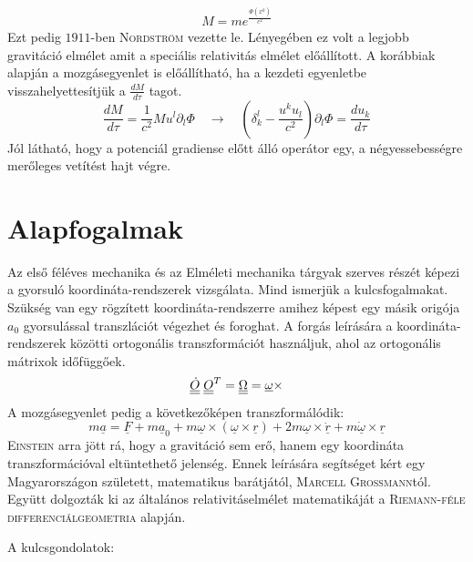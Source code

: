 \documentclass[a4paper, 12pt]{article}
\def\doubleunderline#1{\underline{\underline{#1}}}
\begin{document}
\begin{align*}
M = m e^{\frac{\Phi(x^{k})}{c^{2}}}
\end{align*}
Ezt pedig $1911$-ben \textsc{Nordström} vezette le. Lényegében ez volt a legjobb gravitáció elmélet amit a speciális relativitás elmélet előállított. A korábbiak alapján a mozgásegyenlet is előállítható, ha a kezdeti egyenletbe visszahelyettesítjük a $\frac{dM}{d\tau}$ tagot.
\begin{equation*}
\frac{dM}{d\tau} = \frac{1}{c^{2}}Mu^{l}\partial_{l}\Phi \quad \rightarrow \quad (\delta^{l}_{k} - \frac{u^{k}u_{l}}{c^{2}})\partial_{l}\Phi = \frac{du_{k}}{d\tau}
\end{equation*}
Jól látható, hogy a potenciál gradiense előtt álló operátor egy, a négyessebességre merőleges vetítést hajt végre.
\section{Alapfogalmak}
\hspace{0.5cm} Az első féléves mechanika és az Elméleti mechanika tárgyak szerves részét képezi a gyorsuló koordináta-rendszerek vizsgálata. Mind ismerjük a kulcsfogalmakat. Szükség van egy rögzített koordináta-rendszerre amihez képest egy másik origója $a_{0}$ gyorsulással transzlációt végezhet és foroghat. A forgás leírására a koordináta-rendszerek közötti ortogonális transzformációt használjuk, ahol az ortogonális mátrixok időfüggőek.
\begin{equation*}
\doubleunderline{\dot{O}}\hspace{0.1cm}\doubleunderline{O}^{T} = \doubleunderline{\Omega} = \underline{\omega} \times
\end{equation*}
A mozgásegyenlet pedig a következőképen transzformálódik:
\begin{equation*}
m\underline{a} = \underline{F} + m\underline{a}_{0} + m \underline{\omega} \times (\underline{\omega} \times \underline{r}) + 2m\underline{\omega}\times\underline{\dot{r}} + m \underline{\dot{\omega}}\times \underline{r}
\end{equation*}
\textsc{Einstein} arra jött rá, hogy a gravitáció sem erő, hanem egy koordináta transzformációval eltüntethető jelenség. Ennek leírására segítséget kért egy Magyarországon született, matematikus barátjától, \textsc{Marcell Grossmann}tól. Együtt dolgozták ki az általános relativitáselmélet matematikáját a \textsc{Riemann-féle differenciálgeometria} alapján. \newline
\par A kulcsgondolatok:
\end{document}
